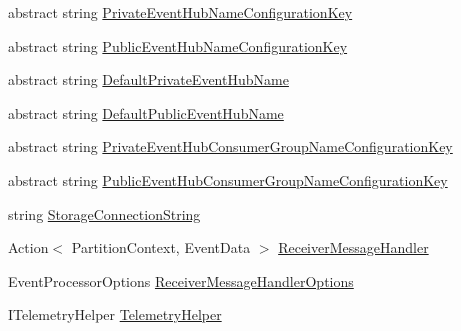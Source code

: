 \begin{DoxyCompactItemize}
\item 
abstract string \hyperlink{classCqrs_1_1Azure_1_1ServiceBus_1_1AzureEventHub_a286a7ddc6becff4d549434d2abe82ed1_a286a7ddc6becff4d549434d2abe82ed1}{Private\+Event\+Hub\+Name\+Configuration\+Key}
\item 
abstract string \hyperlink{classCqrs_1_1Azure_1_1ServiceBus_1_1AzureEventHub_a3ef1f56ad3de3bf8337f68e73627fab2_a3ef1f56ad3de3bf8337f68e73627fab2}{Public\+Event\+Hub\+Name\+Configuration\+Key}
\item 
abstract string \hyperlink{classCqrs_1_1Azure_1_1ServiceBus_1_1AzureEventHub_a8912bae90f45042ed41ff7a7632c178f_a8912bae90f45042ed41ff7a7632c178f}{Default\+Private\+Event\+Hub\+Name}
\item 
abstract string \hyperlink{classCqrs_1_1Azure_1_1ServiceBus_1_1AzureEventHub_a11645c85a3c749ca664480867c6fae3c_a11645c85a3c749ca664480867c6fae3c}{Default\+Public\+Event\+Hub\+Name}
\item 
abstract string \hyperlink{classCqrs_1_1Azure_1_1ServiceBus_1_1AzureEventHub_ad2095d284821cff883fef5a2a5aec90e_ad2095d284821cff883fef5a2a5aec90e}{Private\+Event\+Hub\+Consumer\+Group\+Name\+Configuration\+Key}
\item 
abstract string \hyperlink{classCqrs_1_1Azure_1_1ServiceBus_1_1AzureEventHub_a36b035065fd3fc38ac136adc59742d34_a36b035065fd3fc38ac136adc59742d34}{Public\+Event\+Hub\+Consumer\+Group\+Name\+Configuration\+Key}
\item 
string \hyperlink{classCqrs_1_1Azure_1_1ServiceBus_1_1AzureEventHub_a2b102538e8b72f9990578fa3bcbe4c12_a2b102538e8b72f9990578fa3bcbe4c12}{Storage\+Connection\+String}
\item 
Action$<$ Partition\+Context, Event\+Data $>$ \hyperlink{classCqrs_1_1Azure_1_1ServiceBus_1_1AzureEventHub_a8c9faa7096d72a45803e6e63a1b3cf30_a8c9faa7096d72a45803e6e63a1b3cf30}{Receiver\+Message\+Handler}
\item 
Event\+Processor\+Options \hyperlink{classCqrs_1_1Azure_1_1ServiceBus_1_1AzureEventHub_ad3a0c2f32d5771fb1f4420fc33c75968_ad3a0c2f32d5771fb1f4420fc33c75968}{Receiver\+Message\+Handler\+Options}
\item 
I\+Telemetry\+Helper \hyperlink{classCqrs_1_1Azure_1_1ServiceBus_1_1AzureEventHub_a4cf19edac088c5ea74408398b3dfd4a2_a4cf19edac088c5ea74408398b3dfd4a2}{Telemetry\+Helper}
\end{DoxyCompactItemize}


